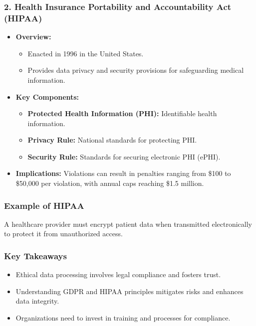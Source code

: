 \documentclass[aspectratio=169]{beamer}
\begin{document}
\begin{frame}[fragile]
    \frametitle{2. Health Insurance Portability and Accountability Act (HIPAA)}
    \begin{itemize}
        \item \textbf{Overview:}
        \begin{itemize}
            \item Enacted in 1996 in the United States.
            \item Provides data privacy and security provisions for safeguarding medical information.
        \end{itemize}
        
        \item \textbf{Key Components:}
        \begin{itemize}
            \item \textbf{Protected Health Information (PHI):} Identifiable health information.
            \item \textbf{Privacy Rule:} National standards for protecting PHI.
            \item \textbf{Security Rule:} Standards for securing electronic PHI (ePHI).
        \end{itemize}
        
        \item \textbf{Implications:}
        Violations can result in penalties ranging from \$100 to \$50,000 per violation, with annual caps reaching \$1.5 million.
    \end{itemize}
\end{frame}

\begin{frame}[fragile]
    \frametitle{Example of HIPAA}
    A healthcare provider must encrypt patient data when transmitted electronically to protect it from unauthorized access.
\end{frame}

\begin{frame}[fragile]
    \frametitle{Key Takeaways}
    \begin{itemize}
        \item Ethical data processing involves legal compliance and fosters trust.
        \item Understanding GDPR and HIPAA principles mitigates risks and enhances data integrity.
        \item Organizations need to invest in training and processes for compliance.
    \end{itemize}
\end{frame}
\end{document}
